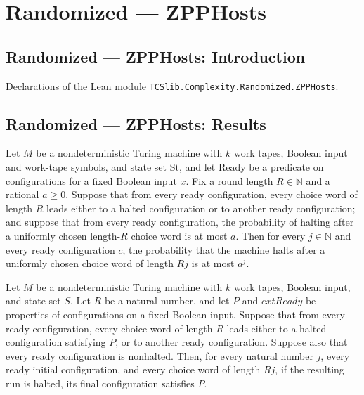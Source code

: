 \section{Randomized --- ZPPHosts}
\subsection*{Randomized --- ZPPHosts: Introduction}

Declarations of the Lean module \texttt{TCSlib.Complexity.Randomized.ZPPHosts}.

\subsection*{Randomized --- ZPPHosts: Results}

\begin{theorem}
\label{Randomized.randProb_rounds_le}
\leanok
{}
Let $M$ be a nondeterministic Turing machine with $k$ work tapes, Boolean input and
work-tape symbols, and state set $\mathrm{St}$, and let $\mathrm{Ready}$ be a predicate
on configurations for a fixed Boolean input $x$. Fix a round length $R\in\mathbb N$ and
a rational $a\ge 0$. Suppose that from every ready configuration, every choice word of
length $R$ leads either to a halted configuration or to another ready configuration; and
suppose that from every ready configuration, the probability of halting after a
uniformly chosen length-$R$ choice word is at most $a$. Then for every $j\in\mathbb N$
and every ready configuration $c$, the probability that the machine halts after a
uniformly chosen choice word of length $Rj$ is at most $a^j$.
\end{theorem}

\begin{theorem}
\label{Randomized.halted_rounds}
\leanok
{}
Let $M$ be a nondeterministic Turing machine with $k$ work tapes, Boolean input, and
state set $S$. Let $R$ be a natural number, and let $P$ and $	ext{Ready}$ be properties
of configurations on a fixed Boolean input. Suppose that from every ready configuration,
every choice word of length $R$ leads either to a halted configuration satisfying $P$,
or to another ready configuration. Suppose also that every ready configuration is
nonhalted. Then, for every natural number $j$, every ready initial configuration, and
every choice word of length $Rj$, if the resulting run is halted, its final
configuration satisfies $P$.
\end{theorem}

